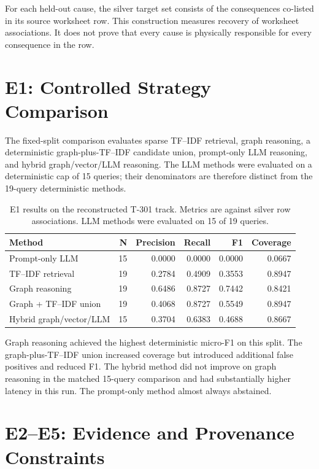 For each held-out cause, the silver target set consists of the consequences
co-listed in its source worksheet row. This construction measures recovery
of worksheet associations. It does not prove that every cause is physically
responsible for every consequence in the row.

\section{E1: Controlled Strategy Comparison}

The fixed-split comparison evaluates sparse TF--IDF retrieval, graph
reasoning, a deterministic graph-plus-TF--IDF candidate union, prompt-only
LLM reasoning, and hybrid graph/vector/LLM reasoning. The LLM methods were
evaluated on a deterministic cap of 15 queries; their denominators are
therefore distinct from the 19-query deterministic methods.

\begin{table}[htbp]
\centering
\caption[E1 fixed-split strategy comparison]{E1 results on the reconstructed
T-301 track. Metrics are against silver row associations. LLM methods were
evaluated on 15 of 19 queries.}
\label{tab:w4-e1}
\small
\begin{tabularx}{\textwidth}{@{}Xrrrrr@{}}
\toprule
\textbf{Method} & \textbf{N} & \textbf{Precision} & \textbf{Recall} &
\textbf{F1} & \textbf{Coverage} \\
\midrule
Prompt-only LLM & 15 & 0.0000 & 0.0000 & 0.0000 & 0.0667 \\
TF--IDF retrieval & 19 & 0.2784 & 0.4909 & 0.3553 & 0.8947 \\
Graph reasoning & 19 & 0.6486 & 0.8727 & 0.7442 & 0.8421 \\
Graph + TF--IDF union & 19 & 0.4068 & 0.8727 & 0.5549 & 0.8947 \\
Hybrid graph/vector/LLM & 15 & 0.3704 & 0.6383 & 0.4688 & 0.8667 \\
\bottomrule
\end{tabularx}
\end{table}

Graph reasoning achieved the highest deterministic micro-F1 on this split.
The graph-plus-TF--IDF union increased coverage but introduced additional
false positives and reduced F1. The hybrid method did not improve on graph
reasoning in the matched 15-query comparison and had substantially higher
latency in this run. The prompt-only method almost always abstained.

\section{E2--E5: Evidence and Provenance Constraints}

